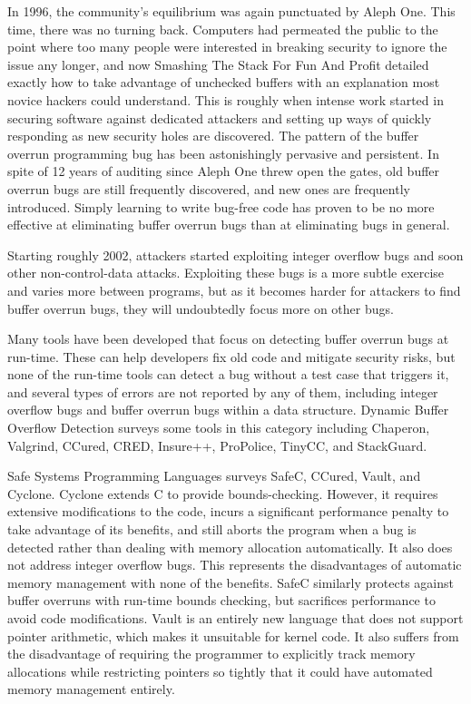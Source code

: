 In 1996, the community's equilibrium was again punctuated by Aleph One.  This time, there was no turning back.  Computers
had permeated the public to the point where too many people were interested in breaking security to ignore the issue
any longer, and now Smashing The Stack For Fun And Profit\cite{1996alephone} detailed exactly how to take advantage of
unchecked buffers with an explanation most novice hackers could understand.  This is roughly when intense work started
in securing software against dedicated attackers and setting up ways of quickly responding as new security holes are
discovered.  The pattern of the buffer overrun programming bug has been astonishingly pervasive and persistent.  In spite
of 12 years of auditing since Aleph One threw open the gates, old buffer overrun bugs are still frequently discovered,
and new ones are frequently introduced.  Simply learning to write bug-free code has proven to be no more effective at
eliminating buffer overrun bugs than at eliminating bugs in general.

Starting roughly 2002\cite{2002blexim,2003ahmad}, attackers started exploiting integer overflow bugs and soon other
non-control-data attacks\cite{2005chen}.  Exploiting these bugs is a more subtle exercise and varies more between
programs, but as it becomes harder for attackers to find buffer overrun bugs, they will undoubtedly focus more on other
bugs.

Many tools have been developed that focus on detecting buffer overrun bugs at run-time.  These can help developers fix
old code and mitigate security risks, but none of the run-time tools can detect a bug without a test case that triggers
it, and several types of errors are not reported by any of them, including integer overflow bugs and buffer overrun
bugs within a data structure.  Dynamic Buffer Overflow Detection\cite{2005zhivich} surveys some tools in this category
including Chaperon, Valgrind, CCured, CRED, Insure++, ProPolice, TinyCC, and StackGuard\cite{1998cowan}.

Safe Systems Programming Languages\cite{2004li} surveys SafeC, CCured, Vault, and Cyclone.  Cyclone extends C to provide
bounds-checking.  However, it requires extensive modifications to the code, incurs a significant performance penalty to
take advantage of its benefits, and still aborts the program when a bug is detected rather than dealing with memory
allocation automatically.  It also does not address integer overflow bugs.  This represents the disadvantages of
automatic memory management with none of the benefits.  SafeC similarly protects against buffer overruns with run-time
bounds checking, but sacrifices performance to avoid code modifications.  Vault is an entirely new language that does
not support pointer arithmetic, which makes it unsuitable for kernel code.  It also suffers from the disadvantage of
requiring the programmer to explicitly track memory allocations while restricting pointers so tightly that it could
have automated memory management entirely.

